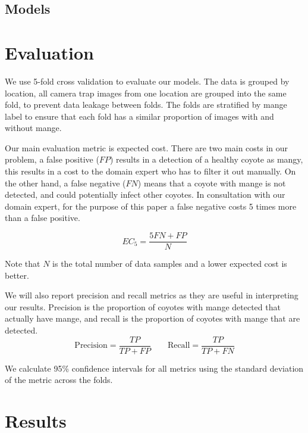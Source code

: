 \documentclass{article}
\begin{document}
\subsection{Models}

\section{Evaluation}
We use 5-fold cross validation to evaluate our models. The data is grouped by
location, all camera trap images from one location are grouped into the same
fold, to prevent data leakage between folds. The folds are stratified by mange
label to ensure that each fold has a similar proportion of images with and
without mange.

Our main evaluation metric is expected cost. There are two main costs in our
problem, a false positive ($FP$) results in a detection of a healthy coyote as
mangy, this results in a cost to the domain expert who has to filter it out
manually. On the other hand, a false negative ($FN$) means that a coyote with
mange is not detected, and could potentially infect other coyotes. In
consultation with our domain expert, for the purpose of this paper a false
negative costs 5 times more than a false positive.

\begin{equation}
  EC_5 = \frac{5FN + FP}{N}
\end{equation}

Note that $N$ is the total number of data samples and a lower expected cost is
better.

We will also report precision and recall metrics as they are useful in
interpreting our results. Precision is the proportion of coyotes with mange
detected that actually have mange, and recall is the proportion of coyotes with
mange that are detected.
\begin{equation}
  \text{Precision} = \frac{TP}{TP+FP} \qquad \text{Recall} = \frac{TP}{TP+FN}
\end{equation}

We calculate 95\% confidence intervals for all metrics using the standard
deviation of the metric across the folds.

\section{Results}
\end{document}
